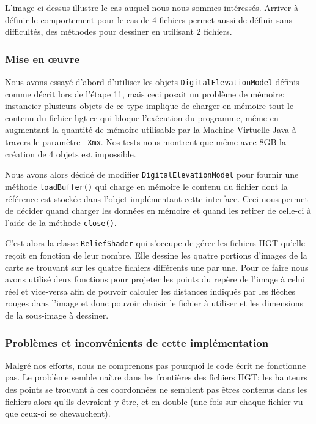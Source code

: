 \documentclass[11pt,a4paper]{article}
\begin{document}
L'image ci-dessus illustre le cas auquel nous nous sommes intéressés. Arriver à définir le comportement pour le cas de 4 fichiers permet aussi de définir sans difficultés, des méthodes pour dessiner en utilisant 2 fichiers.

\subsubsection*{Mise en œuvre}
Nous avons essayé d'abord d'utiliser les objets \texttt{DigitalElevationModel} définis comme décrit lors de l'étape 11, mais ceci posait un problème de mémoire: instancier plusieurs objets de ce type implique de charger en mémoire tout le contenu du fichier hgt ce qui bloque l'exécution du programme, même en augmentant la quantité de mémoire utilisable par la Machine Virtuelle Java à travers le paramètre \texttt{-Xmx}. Nos tests nous montrent que même avec 8GB la création de 4 objets est impossible.

Nous avons alors décidé de modifier \texttt{DigitalElevationModel} pour fournir une méthode \texttt{loadBuffer()} qui charge en mémoire le contenu du fichier dont la référence est stockée dans l'objet implémentant cette interface. Ceci nous permet de décider quand charger les données en mémoire et quand les retirer de celle-ci à l'aide de la méthode \texttt{close()}.

C'est alors la classe \texttt{ReliefShader} qui s'occupe de gérer les fichiers HGT qu'elle reçoit en fonction de leur nombre. Elle dessine les quatre portions d'images de la carte se trouvant sur les quatre fichiers différents une par une. Pour ce faire nous avons utilisé deux fonctions pour projeter les points du repère de l'image à celui réel et vice-versa afin de pouvoir calculer les distances indiqués par les flèches rouges dans l'image et donc pouvoir choisir le fichier à utiliser et les dimensions de la sous-image à dessiner.

\subsubsection*{Problèmes et inconvénients de cette implémentation}
Malgré nos efforts, nous ne comprenons pas pourquoi le code écrit ne fonctionne pas. Le problème semble naître dans les frontières des fichiers HGT: les hauteurs des points se trouvant à ces coordonnées ne semblent pas êtres contenus dans les fichiers alors qu'ils devraient y être, et en double (une fois sur chaque fichier vu que ceux-ci se chevauchent).
\end{document}
